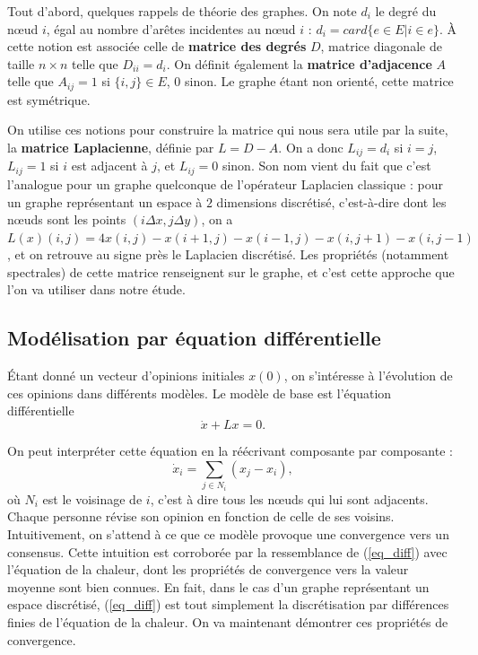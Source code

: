 \documentclass[12pt]{article}
\begin{document}
Tout d'abord, quelques rappels de théorie des graphes. On note $d_i$
le degré du n\oe ud $i$, égal au nombre d'arêtes incidentes au n\oe ud
$i$ : $d_i = card \{e \in E | i \in e\}$. À cette notion est
associée celle de {\bf matrice des degrés} $D$, matrice diagonale
de taille $n \times n$ telle que $D_{i i} = d_i$. On définit
également la {\bf matrice d'adjacence} $A$ telle que $A_{i j} = 1$
si $\{i, j\} \in E$, $0$ sinon. Le graphe étant non orienté, cette
matrice est symétrique.

On utilise ces notions pour construire la matrice qui nous sera
utile par la suite, la {\bf matrice Laplacienne}, définie par $L
= D - A$. On a donc $L_{i j} = d_i$ si $i = j$, $L_{i j} = 1$ si
$i$ est adjacent à $j$, et $L_{i j} = 0$ sinon. Son nom vient du
fait que c'est l'analogue pour un graphe quelconque de
l'opérateur Laplacien classique : pour un graphe représentant un
espace à $2$ dimensions discrétisé, c'est-à-dire dont les n\oe uds
sont les points $(i \Delta x, j \Delta y)$, on a $L(x) (i, j) =
4 x(i, j) - x(i+1, j) - x(i-1, j) - x(i, j+1) - x(i, j-1)$, et
on retrouve au signe près le Laplacien discrétisé. Les
propriétés (notamment spectrales) de cette matrice renseignent
sur le graphe, et c'est cette approche que l'on va utiliser dans
notre étude.

\subsection{Modélisation par équation différentielle}
Étant donné un vecteur d'opinions initiales $x(0)$, on
s'intéresse à l'évolution de ces opinions dans différents
modèles. Le modèle de base est l'équation différentielle
\begin{equation}
 \label{eq_diff}
 \dot x + L x = 0.
\end{equation}

On peut interpréter cette équation en la réécrivant composante par composante :
\begin{equation}
 \label{eq_diff_scal}
 \dot {x}_i = \sum_{j \in N_i} (x_j - x_i),
\end{equation}
où $N_i$ est le voisinage de $i$, c'est à dire tous les n\oe uds qui lui
sont adjacents. Chaque personne révise son opinion en fonction de
celle de ses voisins. Intuitivement, on s'attend à ce que ce modèle
provoque une convergence vers un consensus. Cette intuition est
corroborée par la ressemblance de (\ref{eq_diff}) avec l'équation de
la chaleur, dont les propriétés de convergence vers la valeur moyenne
sont bien connues. En fait, dans le cas d'un graphe représentant un
espace discrétisé, (\ref{eq_diff}) est tout simplement la
discrétisation par différences finies de l'équation de la chaleur. On
va maintenant démontrer ces propriétés de convergence.
\end{document}
